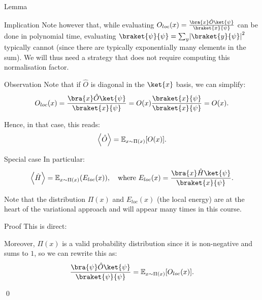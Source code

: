 \documentclass[a4paper]{article}
\begin{document}
\begin{parag}{Lemma}
\begin{subparag}{Implication}
        Note however that, while evaluating $O_{loc}\left(x\right) = \frac{\bra{x} \hat{O} \ket{\psi}}{\braket{x}{\psi}}$ can be done in polynomial time, evaluating $\braket{\psi}{\psi} = \sum_{y} \left|\braket{y}{\psi}\right|^2$ typically cannot (since there are typically exponentially many elements in the sum). We will thus need a strategy that does not require computing this normalisation factor.
    \end{subparag}

    \begin{subparag}{Observation}
        Note that if $\hat{O}$ is diagonal in the $\ket{x}$ basis, we can simplify: 
        \[O_{loc}\left(x\right) = \frac{\bra{x} \hat{O} \ket{\psi}}{\braket{x}{\psi}} = O\left(x\right) \frac{\braket{x}{\psi}}{\braket{x}{\psi}} = O\left(x\right).\]

        Hence, in that case, this reads: 
        \[\left\langle \hat{O} \right\rangle = \exval_{x \followsdistr \Pi\left(x\right)}\left[O\left(x\right)\right].\]
    \end{subparag}

    \begin{subparag}{Special case}
        In particular:
        \[\left\langle \hat{H} \right\rangle = \exval_{x \followsdistr \Pi\left(x\right)}\left(E_{loc}\left(x\right)\right), \mathspace \text{where }E_{loc}\left(x\right) = \frac{\bra{x} \hat{H} \ket{\psi}}{\braket{x}{\psi}}.\]

        Note that the distribution $\Pi\left(x\right)$ and $E_{loc}\left(x\right)$ (the local energy) are at the heart of the variational approach and will appear many times in this course.
    \end{subparag}

    \begin{subparag}{Proof}
        This is direct:

        Moreover, $\Pi\left(x\right)$ is a valid probability distribution since it is non-negative and sums to $1$, so we can rewrite this as:
        \[\frac{\bra{\psi} \hat{O} \ket{\psi}}{\braket{\psi}{\psi}} = \exval_{x \followsdistr \Pi\left(x\right)} \left[O_{loc}\left(x\right)\right].\]
        
        \qed
    \end{subparag}
\end{parag}
\end{document}
